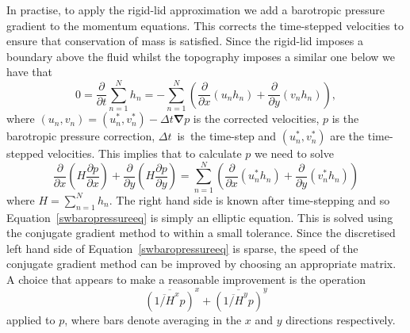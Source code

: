 \documentclass[12pt,a4paper]{report}
\newcommand*\equref[1]{Equation~\eqref{#1}}
\begin{document}
  In practise, to apply the rigid-lid approximation we add a barotropic pressure
  gradient to the momentum equations. This corrects the time-stepped velocities 
  to ensure that conservation of mass is satisfied. Since the rigid-lid imposes a
  boundary above the fluid whilst the topography imposes a similar one below 
  we have that 
  \begin{equation}
  0=\frac{  \partial}{\partial t} \sum^{N}_{n=1} h_{n} = -
  \sum^{N}_{n=1} \left( \frac{\partial }{\partial x} (u_{n}h_{n} )+ 
  \frac{\partial }{\partial y} (v_{n}h_{n} ) \right) ,
  \end{equation}
  where $\left(u_n,v_n\right)=\left(u_n^{*},v^{*}_n\right)-\Delta t \boldsymbol{\nabla}p$
  is the corrected velocities, $p$ is the barotropic pressure correction,
  $\Delta t$~is~the time-step and
  $\left(u_n^{*},v^{*}_n\right)$ are the time-stepped velocities. This implies that to
  calculate $p$ we need to solve 
  \begin{equation}
  \frac{  \partial}{\partial x} \left( H \frac{  \partial p}{\partial x} \right) +
  \frac{  \partial}{\partial y} \left( H \frac{  \partial p}{\partial y} \right) =
  \sum^{N}_{n=1} \left( \frac{\partial }{\partial x} (u^{*}_{n}h_{n} )+ 
  \frac{\partial }{\partial y} (v^{*}_{n}h_{n} ) \right)
  \label{swbaropressureeq}
  \end{equation}
  where $H= \sum^{N}_{n=1} h_{n}$. The right hand side is known after time-stepping 
  and so \equref{swbaropressureeq} is simply an elliptic equation. This is solved using
  the conjugate gradient method to within a small tolerance. Since
  the discretised left hand side of \equref{swbaropressureeq} is sparse, the speed of the 
  conjugate gradient method can be improved by choosing an appropriate matrix.
  A choice that appears to make a reasonable improvement is the operation
  \begin{equation}
  \overline{\left(\overline{1/H}^{x} p\right) }^{x} + \overline{\left(\overline{1/H}^{y} p\right) }^{y}
  \end{equation}
  applied to $p$, where bars denote averaging in the $x$ and $y$ directions respectively.
  
\end{document}
